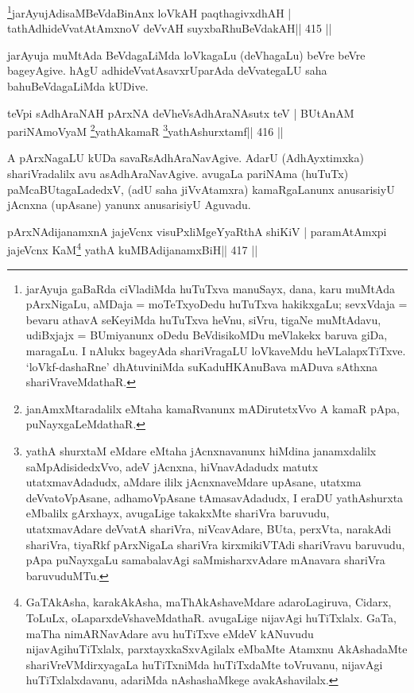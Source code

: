 \begin{shl}
\footnote{jarAyuja gaBaRda ciVladiMda huTuTxva manuSayx, dana, 
karu muMtAda pArxNigaLu, aMDaja = moTeTxyoDedu huTuTxva hakikxgaLu; 
sevxVdaja = bevaru athavA seKeyiMda huTuTxva heVnu, siVru, tigaNe 
muMtAdavu, udiBxjajx = BUmiyanunx oDedu BeVdisikoMDu meVlakekx baruva 
giDa, maragaLu. I nAlukx bageyAda shariVragaLU loVkaveMdu heVLalapxTiTxve. `loVkf-dashaRne' dhAtuviniMda suKaduHKAnuBava mADuva sAthxna shariVraveMdathaR.}jarAyujAdisaMBeVdaBinAnx loVkAH paqthagivxdhAH |
tathA\s dhideVvatAtAmxnoV deVvAH suyxbaRhuBeVdakAH\hfill || 415 ||
\end{shl}

\begin{artha}
jarAyuja muMtAda BeVdagaLiMda loVkagaLu (deVhagaLu) beVre beVre  bageyAgive. hAgU adhideVvatAsavxrUparAda deVvategaLU saha bahuBeVdagaLiMda kUDive.
\end{artha}

\begin{shl}
teV\s pi sAdhAraNAH pArxNA deVheV\s sAdhAraNAsutx teV |
BUtAnAM pariNAmoV\s yaM \footnote{janAmxMtaradalilx eMtaha kamaRvanunx mADirutetxVvo A 
kamaR pApa, puNayxgaLeMdathaR.}yathAkamaR \footnote{yathA shurxtaM eMdare eMtaha jAcnxnavanunx hiMdina 
janamxdalilx saMpAdisidedxVvo, adeV jAcnxna, hiVnavAdadudx matutx utatxmavAdadudx, aMdare ililx jAcnxnaveMdare upAsane, utatxma deVvatoVpAsane, adhamoVpAsane tAmasavAdadudx, I eraDU yathAshurxta eMbalilx gArxhayx, avugaLige takakxMte shariVra baruvudu, utatxmavAdare deVvatA shariVra, niVcavAdare, BUta, perxVta, narakAdi shariVra, tiyaRkf pArxNigaLa shariVra kirxmikiVTAdi shariVravu baruvudu, pApa puNayxgaLu samabalavAgi saMmisharxvAdare mAnavara shariVra baruvuduMTu.}yathAshurxtamf\hfill || 416 ||
\end{shl}

\begin{artha}
A pArxNagaLU kUDa savaRsAdhAraNavAgive. AdarU (AdhAyxtimxka) shariVradalilx avu asAdhAraNavAgive. avugaLa pariNAma (huTuTx) paMcaBUtagaLadedxV, (adU saha jiVvAtamxra) kamaRgaLanunx anusarisiyU jAcnxna (upAsane) yanunx anusarisiyU Aguvadu.
\end{artha}

\begin{shl}
pArxNAdijanamxnA jajeVcnx visuPxliMgeYyaRthA shiKiV |
paramAtAmx\s pi jajeVcnx KaM\footnote{GaTAkAsha, karakAkAsha, maThAkAshaveMdare 
adaroLagiruva, Cidarx, ToLuLx, oLaparxdeVshaveMdathaR. avugaLige 
nijavAgi huTiTxlalx. GaTa, maTha nimARNavAdare avu huTiTxve eMdeV kANuvudu nijavAgihuTiTxlalx, parxtayxkaSxvAgilalx eMbaMte Atamxnu AkAshadaMte shariVreVMdirxyagaLa huTiTxniMda huTiTxdaMte toVruvanu, nijavAgi huTiTxlalxdavanu, adariMda nAshashaMkege avakAshavilalx.} yathA kuMBAdijanamxBiH\hfill || 417 ||
\end{shl}

